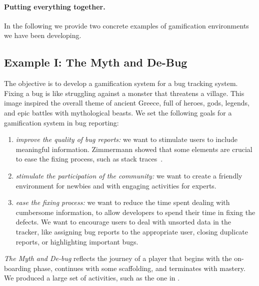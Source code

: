 \paragraph{Putting everything together.} In the following we provide two concrete examples of gamification environments we have been developing.

\subsection{Example I: The Myth and De-Bug}\label{sec:gamification-example-bugs}

The objective is to develop a gamification system for a bug tracking system.
Fixing a bug is like struggling against a monster that threatens a village.
This image inspired the overall theme of ancient Greece, full of heroes, gods, legends, and epic battles with mythological beasts.
We set the following goals for a gamification system in bug reporting:
\begin{enumerate}[(1)]
	\item \emph{improve the quality of bug reports:} we want to stimulate users to include meaningful information.
Zimmermann \etal showed that some elements are crucial to ease the fixing process, such as stack traces~\cite{Zimm2010a}.
	\item \emph{stimulate the participation of the community:} we want to create a friendly environment for newbies and with engaging activities for experts.
	\item \emph{ease the fixing process:} we want to reduce the time spent dealing with cumbersome information, to allow developers to spend their time in fixing the defects.
We want to encourage users to deal with unsorted data in the tracker, like assigning bug reports to the appropriate user, closing duplicate reports, or highlighting important bugs.
\end{enumerate}

\textit{The Myth and De-bug} reflects the journey of a player that begins with the on-boarding phase, continues with some scaffolding, and terminates with mastery.
We produced a large set of activities, such as the one in .


